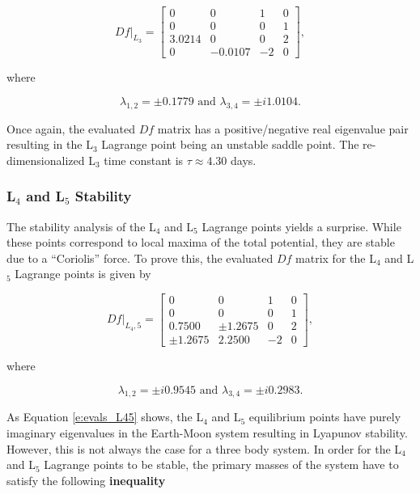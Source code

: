 \documentclass[11pt]{article} %
\begin{document}
\doublespacing
\begin{equation}
	\label{e:df_eval_L3}
	Df|_{L_3} = 
	\begin{bmatrix} 
		0 & 0 & 1  & 0 \\ 
		0 & 0 & 0 & 1 \\
		3.0214 & 0 & 0 & 2 \\
		0 & -0.0107 & -2 & 0
	\end{bmatrix},
\end{equation}
\singlespacing

\noindent
where

\begin{equation}
	\label{e:evals_L3}
	\lambda_{1,2} = \pm 0.1779 \text{ and } \lambda_{3,4} = \pm i1.0104.
\end{equation}

\noindent
Once again, the evaluated $Df$ matrix has a positive/negative real eigenvalue pair resulting in the L$_3$ Lagrange point being an unstable saddle point. The re-dimensionalized L$_3$ time constant is $\tau\approx4.30$ days.

\subsubsection{L$_4$ and L$_5$ Stability}
The stability analysis of the L$_4$ and L$_5$ Lagrange points yields a surprise. While these points correspond to local maxima of the total potential, they are stable due to a ``Coriolis'' force. To prove this, the evaluated $Df$ matrix for the L$_4$ and L$_5$ Lagrange points is given by

\doublespacing
\begin{equation}
	\label{e:df_eval_L45}
	Df|_{L_4,5} = 
	\begin{bmatrix} 
		0 & 0 & 1  & 0 \\ 
		0 & 0 & 0 & 1 \\
		0.7500 & \pm1.2675 & 0 & 2 \\
		\pm1.2675 & 2.2500 & -2 & 0
	\end{bmatrix},
\end{equation}
\singlespacing

\noindent
where

\begin{equation}
	\label{e:evals_L45}
	\lambda_{1,2} = \pm i0.9545 \text{ and } \lambda_{3,4} = \pm i0.2983.
\end{equation}

\noindent
As Equation \ref{e:evals_L45} shows, the L$_4$ and L$_5$ equilibrium points have purely imaginary eigenvalues in the Earth-Moon system resulting in Lyapunov stability. However, this is not always the case for a three body system. In order for the L$_4$ and L$_5$ Lagrange points to be stable, the primary masses of the system have to satisfy the following \textbf{inequality \cite{ScheersBook}}
\end{document}
